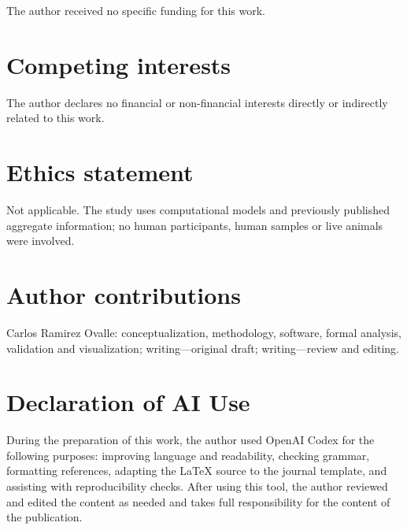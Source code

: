\documentclass[JMCS,submit]{resources/ISRP}
\theoremstyle{definition}
\theoremstyle{remark}
\numberwithin{equation}{section}
\begin{document}
The author received no specific funding for this work.

\section*{Competing interests}

The author declares no financial or non-financial interests directly or
indirectly related to this work.

\section*{Ethics statement}

Not applicable. The study uses computational models and previously published
aggregate information; no human participants, human samples or live animals were
involved.

\section*{Author contributions}

Carlos Ramirez Ovalle: conceptualization, methodology, software, formal analysis,
validation and visualization; writing---original draft; writing---review and
editing.

\section*{Declaration of AI Use}

During the preparation of this work, the author used OpenAI Codex for the
following purposes: improving language and readability, checking grammar,
formatting references, adapting the LaTeX source to the journal template, and
assisting with reproducibility checks. After using this tool, the author reviewed
and edited the content as needed and takes full responsibility for the content of
the publication.

\end{document}
